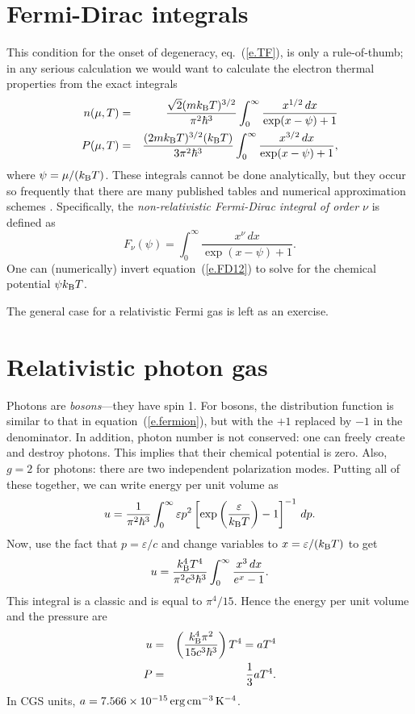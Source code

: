 \section{Fermi-Dirac integrals}
This condition for the onset of degeneracy, eq.~(\ref{e.TF}), is only a rule-of-thumb; in any serious calculation we would want to calculate the electron thermal properties from the exact integrals
\begin{eqnarray}\label{e.FD12}
n(\mu,T) &=& \frac{\sqrt{2}(mk_\mathrm{B} T)^{3/2}}{\pi^{2}\hbar^{3}}\int_{0}^{\infty} \frac{x^{1/2}\,dx}{\exp(x-\psi)+1} \\
P(\mu,T) &=& \frac{(2mk_\mathrm{B} T)^{3/2}(k_\mathrm{B} T)}{3\pi^{2}\hbar^{3}}\int_{0}^{\infty} \frac{x^{3/2}\,dx}{\exp(x-\psi)+1},
\end{eqnarray}
where $\psi = \mu/(k_\mathrm{B} T)$.  These integrals cannot be done analytically, but they occur so frequently that there are many published tables and numerical approximation schemes \citep[see][]{timmes.swesty:accuracy}.  Specifically, the \emph{non-relativistic Fermi-Dirac integral of order $\nu$} is defined as
\begin{equation}\label{e.FDintegral}
F_{\nu}(\psi) = \int_{0}^{\infty}\frac{ x^{\nu}\,dx}{\exp(x-\psi)+1}.
\end{equation}
One can (numerically) invert equation~(\ref{e.FD12}) to solve for the chemical potential $\psi k_\mathrm{B} T$.

The general case for a relativistic Fermi gas is left as an exercise.

\section{Relativistic photon gas}\label{s.relativistic-photon-gas}
Photons are \emph{bosons}---they have spin 1. For bosons, the distribution function is similar to that in equation~(\ref{e.fermion}), but with the $+1$ replaced by $-1$ in the denominator. In addition, photon number is not conserved: one can freely create and destroy photons.  This implies that their chemical potential is zero.  Also, $g=2$ for photons: there are two independent polarization modes. Putting all of these together, we can write energy per unit volume as
\begin{equation}\label{e.boson-dist}
u = \frac{1}{\pi^{2}\hbar^{3}}\int_{0}^{\infty}\varepsilon p^{2}\left[\exp\left(\frac{\varepsilon}{k_\mathrm{B} T}\right)-1\right]^{-1}\,dp.
\end{equation}
Now, use the fact that $p = \varepsilon/c$ and change variables to $x = \varepsilon/(k_\mathrm{B} T)$ to get
\[
 u = \frac{k_\mathrm{B} ^{4}T^{4}}{\pi^{2}c^{3}\hbar^{3}}\int_{0}^{\infty} \frac{x^{3}\,dx}{e^{x}-1}.
\]
This integral is a classic and is equal to $\pi^{4}/15$.  Hence the energy per unit volume and the pressure are
\begin{eqnarray}\label{e.radiation-eos}
u &=& \left(\frac{k_\mathrm{B} ^{4}\pi^{2}}{15 c^{3}\hbar^{3}} \right) T^{4} = aT^{4}\\
P &=& \frac{1}{3} aT^{4}.
\end{eqnarray}
In CGS units, $a = 7.566\times 10^{-15}\,\mathrm{erg}\,\mathrm{c}\mathrm{m}^{-3}\,\mathrm{K}^{-4}$.

